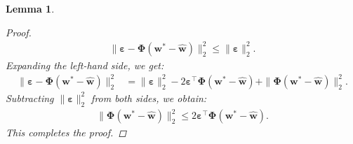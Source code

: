 \documentclass{article}
\theoremstyle{plain}
\newtheorem{lemma}[theorem]{Lemma}
\theoremstyle{definition}
\theoremstyle{remark}
\begin{document}
\begin{lemma}
\begin{proof}[Proof]
\begin{align*}
    \|\bm{\varepsilon} - \bm{\Phi}(\bm{w}^* - \hat{\bm{w}})\|_2^2 \leq \|\bm{\varepsilon}\|_2^2.
\end{align*}
Expanding the left-hand side, we get:
\begin{align*}
    \|\bm{\varepsilon} - \bm{\Phi}(\bm{w}^* - \hat{\bm{w}})\|_2^2 &= \|\bm{\varepsilon}\|_2^2 - 2 \bm{\varepsilon}^{\top} \bm{\Phi}(\bm{w}^* - \hat{\bm{w}}) + \|\bm{\Phi}(\bm{w}^* - \hat{\bm{w}})\|_2^2.
\end{align*}
Subtracting \(\|\bm{\varepsilon}\|_2^2\) from both sides, we obtain:
\begin{align*}
    \|\bm{\Phi}(\bm{w}^* - \hat{\bm{w}})\|_2^2 \leq 2 \bm{\varepsilon}^{\top} \bm{\Phi}(\bm{w}^* - \hat{\bm{w}}).
\end{align*}
This completes the proof.
\end{proof}
\end{lemma}
\end{document}
